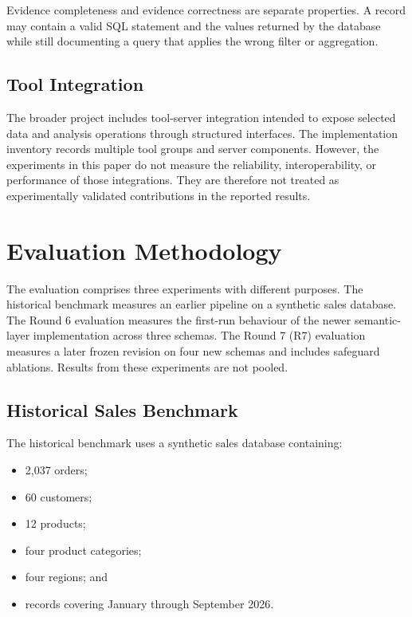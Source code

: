 \documentclass[conference]{IEEEtran}
\providecommand{\tightlist}{\setlength{\itemsep}{0pt}\setlength{\parskip}{0pt}}
\begin{document}
Evidence completeness and evidence correctness are separate properties. A record may contain a valid SQL statement and the values returned by the database while still documenting a query that applies the wrong filter or aggregation.

\subsection{Tool Integration}

The broader project includes tool-server integration intended to expose selected data and analysis operations through structured interfaces. The implementation inventory records multiple tool groups and server components. However, the experiments in this paper do not measure the reliability, interoperability, or performance of those integrations. They are therefore not treated as experimentally validated contributions in the reported results.

\section{Evaluation Methodology}

The evaluation comprises three experiments with different purposes. The historical benchmark measures an earlier pipeline on a synthetic sales database. The Round 6 evaluation measures the first-run behaviour of the newer semantic-layer implementation across three schemas. The Round 7 (R7) evaluation measures a later frozen revision on four new schemas and includes safeguard ablations. Results from these experiments are not pooled.

\subsection{Historical Sales Benchmark}

The historical benchmark uses a synthetic sales database containing:

\begin{itemize}
\tightlist
\item
  2,037 orders;
\item
  60 customers;
\item
  12 products;
\item
  four product categories;
\item
  four regions; and
\item
  records covering January through September 2026.
\end{itemize}
\end{document}
